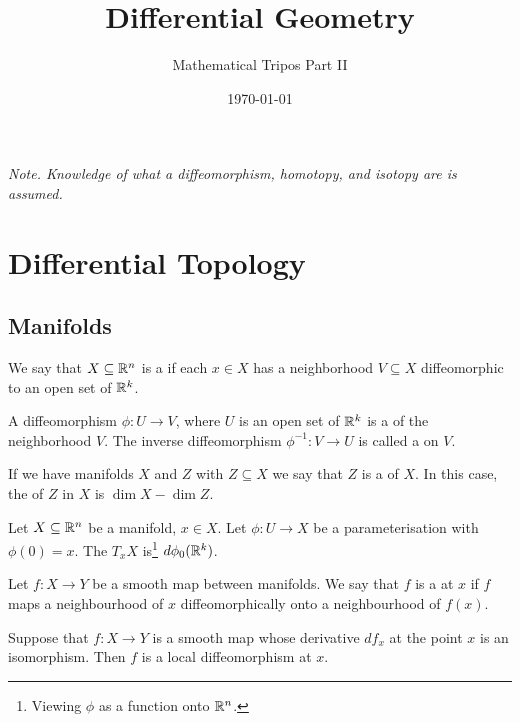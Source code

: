 \documentclass[10pt]{article}
\title{Differential Geometry}
\author{Mathematical Tripos Part II}
\date{\today}
\begin{document}

\maketitle



\emph{Note. Knowledge of what a diffeomorphism, homotopy, and isotopy are is assumed.}


\section{Differential Topology}

\subsection{Manifolds}


\begin{definition}[Manifold]
    We say that $X \subseteq \mathbb{R}^n$ is a  if each $x \in X$ has a neighborhood $V \subseteq X$ diffeomorphic to an open set of $\mathbb{R}^k$. 
\end{definition}

\begin{definition}
    A diffeomorphism $\phi: U \rightarrow V$, where $U$ is an open set of $\mathbb{R}^k$ is a  of the neighborhood $V$. The inverse diffeomorphism $\phi^{-1}: V \rightarrow U$ is called a  on $V$.
\end{definition}

If we have manifolds $X$ and $Z$ with $Z \subseteq X$ we say that $Z$ is a  of $X$. In this case, the  of $Z$ in $X$ is $\dim X - \dim Z$.

\begin{definition}
    Let $X \subseteq \mathbb{R}^n$ be a manifold, $x \in X$. Let $\phi: U \rightarrow X$ be a parameterisation with $\phi(0) = x$. The  $T_x X$ is\footnote{Viewing $\phi$ as a function onto $\mathbb{R}^n$.} $d\phi_0(\mathbb{R}^k)$. 
\end{definition}


Let $f: X \rightarrow Y$ be a smooth map between manifolds. We say that $f$ is a  at $x$ if $f$ maps a neighbourhood of $x$ diffeomorphically onto a neighbourhood of $f(x)$.

\begin{theorem}
    Suppose that $f: X \rightarrow Y$ is a smooth map whose derivative $d f_{x}$ at the point $x$ is an isomorphism. Then $f$ is a local diffeomorphism at $x$.
\end{theorem}
\end{document}

